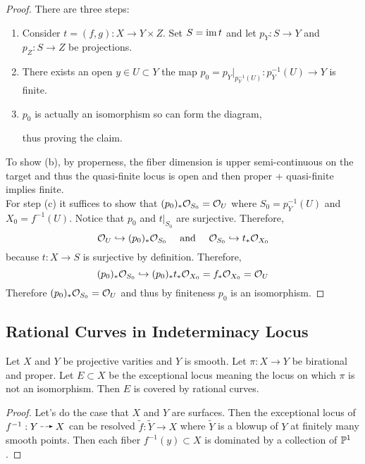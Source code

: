 \documentclass[12pt]{article}
\begin{document}
\begin{proof}
There are three steps:
\begin{enumerate}
\item Consider $t = (f,g) : X \to Y \times Z$. Set $S = \im{t}$ and let $p_Y : S \to Y$ and $p_Z : S \to Z$ be projections. 
\item There exists an open $y \in U \subset Y$ the map $p_0 = p_Y |_{p_Y^{-1}(U)} : p_Y^{-1}(U) \to Y$ is finite.
\item $p_0$ is actually an isomorphism so can form the diagram,
\begin{center}
\end{center}
thus proving the claim. 
\end{enumerate}
To show (b), by properness, the fiber dimension is upper semi-continuous on the target and thus the quasi-finite locus is open and then proper + quasi-finite implies finite. 
\bigskip\\
For step (c) it suffices to show that $(p_0)_* \struct{S_0} = \struct{U}$ where $S_0 = p_Y^{-1}(U)$ and $X_0 = f^{-1}(U)$. Notice that $p_0$ and $t|_{S_0}$ are surjective. Therefore, 
\[ \struct{U} \embed (p_0)_* \struct{S_0} \quad \text{ and } \quad \struct{S_0} \embed t_* \struct{X_0} \]
because $t : X \to S$ is surjective by definition. Therefore,
\[ (p_0)_* \struct{S_0} \embed (p_0)_* t_* \struct{X_0} = f_* \struct{X_0} = \struct{U} \]
Therefore $(p_0)_* \struct{S_0} = \struct{U}$ and thus by finiteness $p_0$ is an isomorphism. 
\end{proof}

\subsection{Rational Curves in Indeterminacy Locus}

\begin{thm}
Let $X$ and $Y$ be projective varities and $Y$ is smooth. Let $\pi : X \to Y$ be birational and proper. Let $E \subset X$ be the exceptional locus meaning the locus on which $\pi$ is not an isomorphism. Then $E$ is covered by rational curves.
\end{thm} 

\begin{proof}
Let's do the case that $X$ and $Y$ are surfaces. Then the exceptional locus of $f^{-1} : Y \rat X$ can be resolved $\tilde{f} : \tilde{Y} \to X$ where $\tilde{Y}$ is a blowup of $Y$ at finitely many smooth points. Then each fiber $f^{-1}(y) \subset X$ is dominated by a collection of $\P^1$.
\end{proof}
\end{document}
